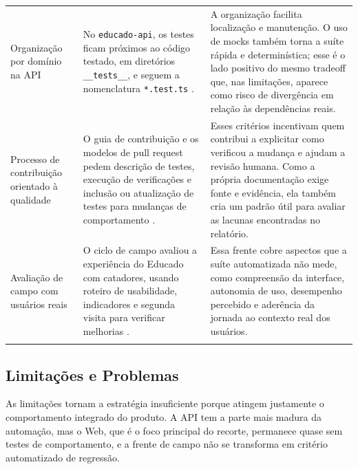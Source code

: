 {\begin{longtable}{>{\raggedright\arraybackslash}p{2.9cm} >{\raggedright\arraybackslash}p{5.1cm} >{\raggedright\arraybackslash}p{5.1cm}}
Organização por domínio na API
&
No \texttt{educado-api}, os testes ficam próximos ao código testado, em
diretórios \texttt{\_\_tests\_\_}, e seguem a nomenclatura \texttt{*.test.ts}
\cite{educado-repos}.
&
A organização facilita localização e manutenção. O uso de mocks também torna a
suíte rápida e determinística; esse é o lado positivo do mesmo tradeoff que, nas
limitações, aparece como risco de divergência em relação às dependências reais.
\\
\addlinespace

Processo de contribuição orientado à qualidade
&
O guia de contribuição e os modelos de pull request pedem descrição de testes,
execução de verificações e inclusão ou atualização de testes para mudanças de
comportamento \cite{educado-repos}.
&
Esses critérios incentivam quem contribui a explicitar como verificou a mudança
e ajudam a revisão humana. Como a própria documentação exige fonte e evidência,
ela também cria um padrão útil para avaliar as lacunas encontradas no relatório.
\\
\addlinespace

Avaliação de campo com usuários reais
&
O ciclo de campo avaliou a experiência do Educado com catadores, usando roteiro
de usabilidade, indicadores e segunda visita para verificar melhorias
\cite{psp5,dashboard}.
&
Essa frente cobre aspectos que a suíte automatizada não mede, como compreensão
da interface, autonomia de uso, desempenho percebido e aderência da jornada ao
contexto real dos usuários.
\\
\addlinespace
\bottomrule
\end{longtable}
}



\subsection{Limitações e Problemas}

As limitações tornam a estratégia insuficiente porque atingem justamente o
comportamento integrado do produto. A API tem a parte mais madura da automação,
mas o Web, que é o foco principal do recorte, permanece quase sem testes de
comportamento, e a frente de campo não se transforma em critério automatizado de
regressão.

